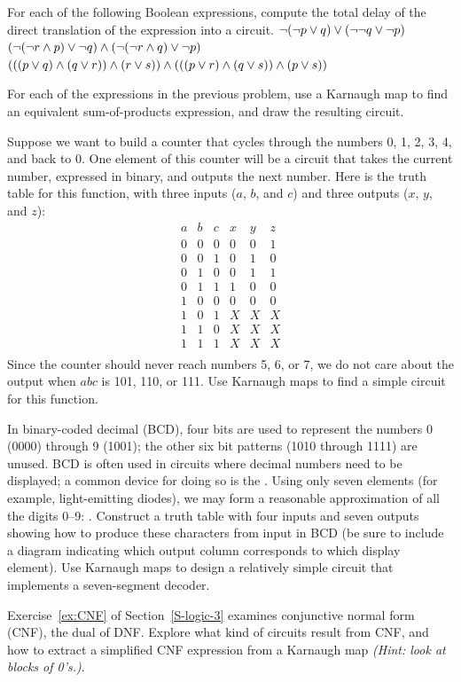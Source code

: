 \begin{exercises}
\problem For each of the following Boolean expressions, compute the total delay of the direct translation of the expression into a circuit.
\ppart $\lnot{(\lnot{p}\vee q)}\vee(\lnot{\lnot{q}}\vee\lnot{p})$
\ppart $(\lnot(\lnot{r}\wedge p)\vee\lnot{q})\wedge(\lnot(\lnot{r}\wedge q)\vee\lnot{p})$
\ppart $(((p\vee q)\wedge(q\vee r))\wedge(r\vee s))\wedge(((p\vee r)\wedge(q\vee s))\wedge(p\vee s))$

\problem For each of the expressions in the previous problem, use a Karnaugh map to find an equivalent sum-of-products expression, and draw the resulting circuit.

\problem Suppose we want to build a counter that cycles through the numbers 0, 1, 2, 3, 4, and back to 0. One element of this counter will be a circuit that takes the current number, expressed in binary, and outputs the next number. Here is the truth table for this function, with three inputs ($a$, $b$, and $c$) and three outputs ($x$, $y$, and $z$):
\[ \begin{array}{ccc|ccc}
a & b & c & x & y & z\\ \hline
0 & 0 & 0 & 0 & 0 & 1\\
0 & 0 & 1 & 0 & 1 & 0\\
0 & 1 & 0 & 0 & 1 & 1\\
0 & 1 & 1 & 1 & 0 & 0\\
1 & 0 & 0 & 0 & 0 & 0\\
1 & 0 & 1 & X & X & X\\
1 & 1 & 0 & X & X & X\\
1 & 1 & 1 & X & X & X\\
\end{array} \]
Since the counter should never reach numbers 5, 6, or 7, we do not care about the output when $abc$ is 101, 110, or 111. Use Karnaugh maps to find a simple circuit for this function.

\problem\label{ex:BCD}In binary-coded decimal (BCD), four bits are used to represent the numbers 0 (0000) through 9 (1001); the other six bit patterns (1010 through 1111) are unused. BCD is often used in circuits where decimal numbers need to be displayed; a common device for doing so is the . Using only seven elements (for example, light-emitting diodes), we may form a reasonable approximation of all the digits 0--9: . Construct a truth table with four inputs and seven outputs showing how to produce these characters from input in BCD (be sure to include a diagram indicating which output column corresponds to which display element). Use Karnaugh maps to design a relatively simple circuit that implements a seven-segment decoder.

\problem Exercise~\ref{ex:CNF} of Section~\ref{S-logic-3} examines conjunctive normal form (CNF), the dual of DNF. Explore what kind of circuits result from CNF, and how to extract a simplified CNF expression from a Karnaugh map \textit{(Hint: look at blocks of 0's.)}.

\end{exercises}

